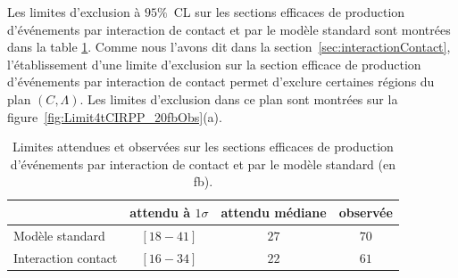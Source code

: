 Les limites d'exclusion \`a $95\%$~CL sur les sections efficaces de production d'\'ev\'enements \fourtop{} par interaction de contact et par le mod\`ele standard sont montr\'ees dans la table \ref{tab:limitsExpObsSMCI}. Comme nous l'avons dit dans la section~\ref{sec:interactionContact}, l'\'etablissement d'une limite d'exclusion sur la section efficace de production d'\'ev\'enements \fourtop{} par interaction de contact permet d'exclure certaines r\'egions du plan $\left(C,\Lambda\right)$. Les limites d'exclusion dans ce plan sont montr\'ees sur la figure~\ref{fig:Limit4tCIRPP_20fbObs}(a).

\begin{table}[!htb]
  \begin{center}
    \begin{tabular}{l|c|c | c}
      \hline
      & attendu \`a $1\sigma$ & attendu m\'ediane & observ\'ee\\
      \hline
      Mod\`ele standard   & $\left[18-41\right]$ & $27$ & $70$ \\
      Interaction contact & $\left[16-34\right]$ & $22$  & $61$ \\
      \hline      
    \end{tabular}
    \caption{Limites attendues et observ\'ees sur les sections efficaces de production d'\'ev\'enements \fourtop{} par interaction de contact et par le mod\`ele standard (en fb).}\label{tab:limitsExpObsSMCI}
  \end{center}
\end{table}

